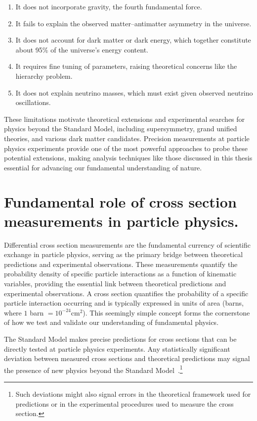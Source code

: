 \begin{definition}
    \begin{enumerate}
        \item It does not incorporate gravity, the fourth fundamental force.
        \item It fails to explain the observed matter--antimatter asymmetry in the universe.
        \item It does not account for dark matter or dark energy, which together constitute about 95\% of the universe's energy content.
        \item  It requires fine tuning of parameters, raising theoretical concerns like the hierarchy problem.
        \item  It does not explain neutrino masses, which must exist given observed neutrino oscillations.
    \end{enumerate}
These limitations motivate theoretical extensions and experimental searches for physics beyond the Standard Model, including supersymmetry, grand unified theories, and various dark matter candidates.
%
Precision measurements at particle physics experiments provide one of the most powerful approaches to probe these potential extensions, making analysis techniques like those discussed in this thesis essential for advancing our fundamental understanding of nature.

\section{Fundamental role of cross section measurements in particle physics.}

Differential cross section measurements are the fundamental currency of scientific exchange in particle physics, serving as the primary bridge between theoretical predictions and experimental observations.
%
These measurements quantify the probability density of specific particle interactions as a function of kinematic variables, providing the essential link between theoretical predictions and experimental observations.
%
 A cross section quantifies the probability of a specific particle interaction occurring and is typically expressed in units of area (barns, where $1$ barn $= 10^{-24} \mathrm{cm}^2$). This seemingly simple concept forms the cornerstone of how we test and validate our understanding of fundamental physics.
 
The Standard Model makes precise predictions for cross sections that can be directly tested at particle physics experiments.
%
Any statistically significant deviation between measured cross sections and theoretical predictions may signal the presence of new physics beyond the Standard Model~\cite{particle_data_group_review_2022}.\footnote{Such deviations might also signal errors in the theoretical framework used for predictions or in the experimental procedures used to measure the cross section.
} 


\end{definition}
